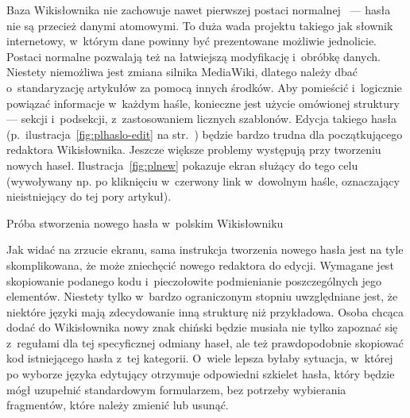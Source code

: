 Baza Wikisłownika nie zachowuje nawet pierwszej postaci normalnej~\cite{book:introduction} --- hasła nie są przecież danymi atomowymi. To duża wada projektu takiego jak słownik internetowy, w~którym dane powinny być prezentowane możliwie jednolicie. Postaci normalne pozwalają też na łatwiejszą modyfikację i~obróbkę danych. Niestety niemożliwa jest zmiana silnika MediaWiki, dlatego należy dbać o~standaryzację artykułów za pomocą innych środków. Aby pomieścić i~logicznie powiązać informacje w~każdym haśle, konieczne jest użycie omówionej struktury --- sekcji i~podsekcji, z~zastosowaniem licznych szablonów. Edycja takiego hasła (p.~ilustracja~\ref{fig:plhaslo-edit} na str.~\pageref{fig:plhaslo-edit}) będzie bardzo trudna dla początkującego redaktora Wikisłownika. Jeszcze większe problemy występują przy tworzeniu nowych haseł. Ilustracja~\ref{fig:plnew} pokazuje ekran służący do tego celu (wywoływany np. po kliknięciu w~czerwony link w~dowolnym haśle, oznaczający nieistniejący do tej pory artykuł).

\begin{illustration}
	\caption{Próba stworzenia nowego hasła w~polskim Wikisłowniku}
	\label{fig:plnew}
\end{illustration}

Jak widać na zrzucie ekranu, sama instrukcja tworzenia nowego hasła jest na tyle skomplikowana, że może zniechęcić nowego redaktora do edycji. Wymagane jest skopiowanie podanego kodu i~pieczołowite podmienianie poszczególnych jego elementów. Niestety tylko w~bardzo ograniczonym stopniu uwzględniane jest, że niektóre języki mają zdecydowanie inną strukturę niż przykładowa. Osoba chcąca dodać do Wikisłownika nowy znak chiński będzie musiała nie tylko zapoznać się z~regułami dla tej specyficznej odmiany haseł, ale też prawdopodobnie skopiować kod istniejącego hasła z~tej kategorii. O~wiele lepsza byłaby sytuacja, w~której po wyborze języka edytujący otrzymuje odpowiedni szkielet hasła, który będzie mógł uzupełnić standardowym formularzem, bez potrzeby wybierania fragmentów, które należy zmienić lub usunąć.

